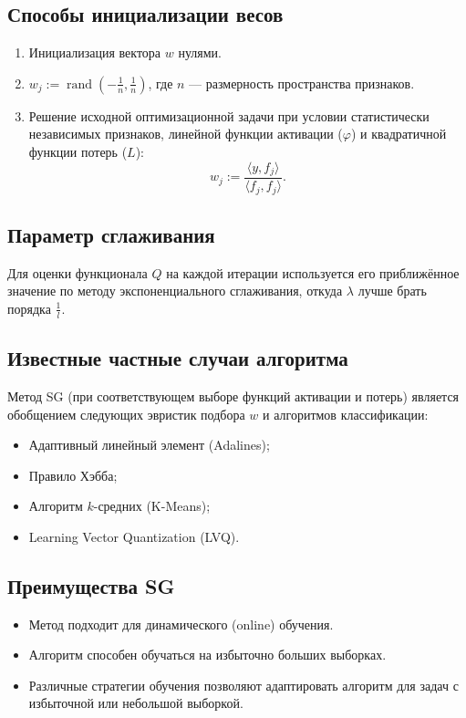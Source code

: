 \subsection*{Способы инициализации весов}
\begin{enumerate}
    \item Инициализация вектора \( w \) нулями.
    \item \( w_j := \operatorname{rand}\left(-\frac{1}{n}, \frac{1}{n}\right) \), где \( n \) — размерность пространства признаков.
    \item Решение исходной оптимизационной задачи при условии статистически независимых признаков, линейной функции активации (\( \varphi \)) и квадратичной функции потерь (\( L \)):
    $$ w_j := \frac{\langle y, f_j \rangle}{\langle f_j, f_j \rangle}. $$
\end{enumerate}

\subsection*{Параметр сглаживания}
Для оценки функционала \( Q \) на каждой итерации используется его приближённое значение по методу экспоненциального сглаживания, откуда \( \lambda \) лучше брать порядка \( \frac{1}{l} \).

\subsection*{Известные частные случаи алгоритма}
Метод SG (при соответствующем выборе функций активации и потерь) является обобщением следующих эвристик подбора \( w \) и алгоритмов классификации:
\begin{itemize}
    \item Адаптивный линейный элемент (Adalines);
    \item Правило Хэбба;
    \item Алгоритм \( k \)-средних (K-Means);
    \item Learning Vector Quantization (LVQ).
\end{itemize}

\subsection*{Преимущества SG}
\begin{itemize}
    \item Метод подходит для динамического (online) обучения.
    \item Алгоритм способен обучаться на избыточно больших выборках.
    \item Различные стратегии обучения позволяют адаптировать алгоритм для задач с избыточной или небольшой выборкой.
\end{itemize}

